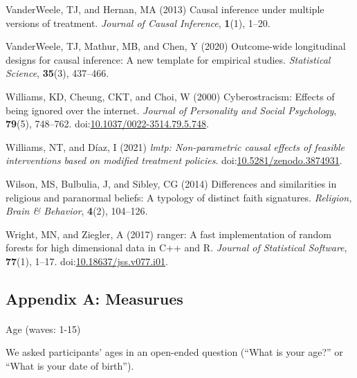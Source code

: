 \documentclass[
  singlecolumn]{article}
\makeatletter
\let\oldparagraph\paragraph
\renewcommand{\paragraph}{
    \@ifstar
      \xxxParagraphStar
      \xxxParagraphNoStar
  }
\newcommand{\xxxParagraphStar}[1]{\oldparagraph*{#1}\mbox{}}
\newcommand{\xxxParagraphNoStar}[1]{\oldparagraph{#1}\mbox{}}
\newlength{\cslhangindent}
\newenvironment{CSLReferences}[2] %
 {\begin{list}{}{%
  \setlength{\itemindent}{0pt}
  \setlength{\leftmargin}{0pt}
  \setlength{\parsep}{0pt}
  \ifodd #1
   \setlength{\leftmargin}{\cslhangindent}
   \setlength{\itemindent}{-1\cslhangindent}
  \fi
  \setlength{\itemsep}{#2\baselineskip}}}
 {\end{list}}
\makeatother
\begin{document}
\begin{CSLReferences}{1}{0}
VanderWeele, TJ, and Hernan, MA (2013) Causal inference under multiple
versions of treatment. \emph{Journal of Causal Inference},
\textbf{1}(1), 1--20.

VanderWeele, TJ, Mathur, MB, and Chen, Y (2020) Outcome-wide
longitudinal designs for causal inference: A new template for empirical
studies. \emph{Statistical Science}, \textbf{35}(3), 437--466.

Williams, KD, Cheung, CKT, and Choi, W (2000) Cyberostracism: Effects of
being ignored over the internet. \emph{Journal of Personality and Social
Psychology}, \textbf{79}(5), 748--762.
doi:\href{https://doi.org/10.1037/0022-3514.79.5.748}{10.1037/0022-3514.79.5.748}.

Williams, NT, and Díaz, I (2021) \emph{{l}mtp: Non-parametric causal
effects of feasible interventions based on modified treatment policies}.
doi:\href{https://doi.org/10.5281/zenodo.3874931}{10.5281/zenodo.3874931}.

Wilson, MS, Bulbulia, J, and Sibley, CG (2014) Differences and
similarities in religious and paranormal beliefs: A typology of distinct
faith signatures. \emph{Religion, Brain \& Behavior}, \textbf{4}(2),
104--126.

Wright, MN, and Ziegler, A (2017) {ranger}: A fast implementation of
random forests for high dimensional data in {C++} and {R}. \emph{Journal
of Statistical Software}, \textbf{77}(1), 1--17.
doi:\href{https://doi.org/10.18637/jss.v077.i01}{10.18637/jss.v077.i01}.

\end{CSLReferences}

\newpage{}

\subsection{Appendix A: Measurues}\label{appendix-measures}

\paragraph{Age (waves: 1-15)}\label{age-waves-1-15}

We asked participants' ages in an open-ended question (``What is your
age?'' or ``What is your date of birth'').
\end{document}
